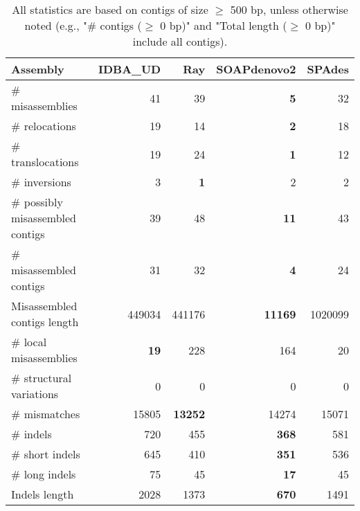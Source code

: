 \documentclass[12pt,a4paper]{article}
\begin{document}
\begin{table}[ht]
\begin{center}
\caption{All statistics are based on contigs of size $\geq$ 500 bp, unless otherwise noted (e.g., "\# contigs ($\geq$ 0 bp)" and "Total length ($\geq$ 0 bp)" include all contigs).}
\begin{tabular}{|l*{4}{|r}|}
\hline
Assembly & IDBA\_UD & Ray & SOAPdenovo2 & SPAdes \\ \hline
\# misassemblies & 41 & 39 & {\bf 5} & 32 \\ \hline
\hspace{5mm}\# relocations & 19 & 14 & {\bf 2} & 18 \\ \hline
\hspace{5mm}\# translocations & 19 & 24 & {\bf 1} & 12 \\ \hline
\hspace{5mm}\# inversions & 3 & {\bf 1} & 2 & 2 \\ \hline
\# possibly misassembled contigs & 39 & 48 & {\bf 11} & 43 \\ \hline
\# misassembled contigs & 31 & 32 & {\bf 4} & 24 \\ \hline
Misassembled contigs length & 449034 & 441176 & {\bf 11169} & 1020099 \\ \hline
\# local misassemblies & {\bf 19} & 228 & 164 & 20 \\ \hline
\# structural variations & 0 & 0 & 0 & 0 \\ \hline
\# mismatches & 15805 & {\bf 13252} & 14274 & 15071 \\ \hline
\# indels & 720 & 455 & {\bf 368} & 581 \\ \hline
\hspace{5mm}\# short indels & 645 & 410 & {\bf 351} & 536 \\ \hline
\hspace{5mm}\# long indels & 75 & 45 & {\bf 17} & 45 \\ \hline
Indels length & 2028 & 1373 & {\bf 670} & 1491 \\ \hline
\end{tabular}
\end{center}
\end{table}
\end{document}
